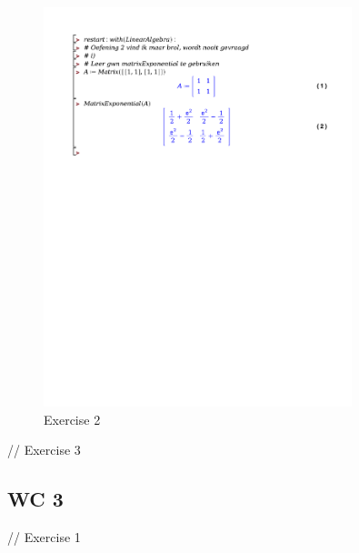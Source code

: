 \documentclass[a4paper]{report}
\begin{document}
\begin{figure}[H]
	\centering
	\includegraphics[width=0.8\textwidth]{exercises/bord_3_ex_2.pdf}
	\caption{Exercise 2}
	\label{fig:bord_3_ex_2}
\end{figure}

// Exercise 3


\subsection*{WC 3}

// Exercise 1

\end{document}
